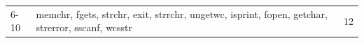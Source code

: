 \begin{table}[t]
\begin{tabular}{@{}lll@{}}
\multicolumn{1}{l|}{6-10}   & \multicolumn{1}{l|}{\parbox{6cm}{memchr, fgets, strchr, exit, strrchr, ungetwc, isprint, fopen, getchar, strerror, sscanf, wcsstr }}                                         & \multicolumn{1}{l}{12}  \\ \cmidrule(l){1-3}
\end{tabular}\vspace{-1mm}
\end{table}




